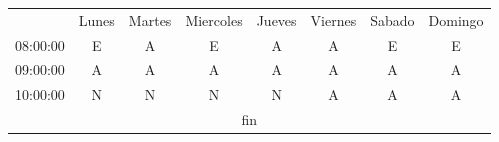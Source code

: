 \documentclass[a4paper]{amsart}
\begin{document}
\begin{tabular}{c|c|c|c|c|c|c|c|}
         &Lunes &Martes &Miercoles &Jueves &Viernes &Sabado &Domingo  \\ \cline{1-8}
08:00:00    & E    & A         & E    & A      & A      & E      & E  \\ \cline{1-8}
09:00:00    & A     & A       & A     & A      & A     & A      & A   \\ \cline{1-8}
10:00:00    & N     & N        & N     & N     & A     & A      & A   \\ \cline{1-8}
\multicolumn{8}{|c|}{fin} \\ \cline{1-8}
\end{tabular}
\end{document}
